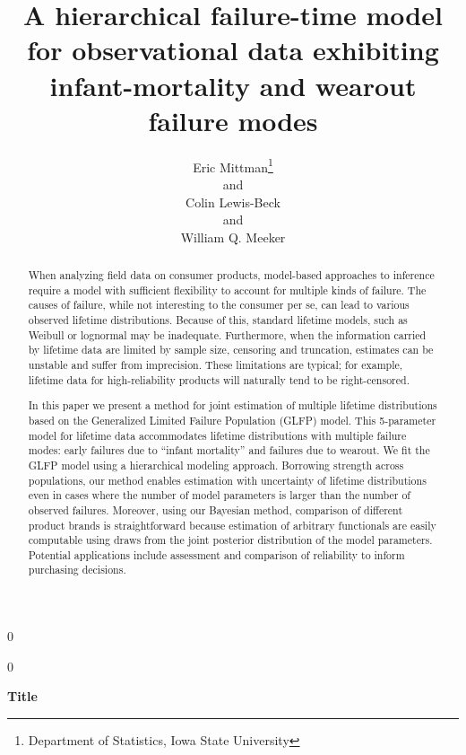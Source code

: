 \documentclass[12pt]{article}
\newcommand{\blind}{0}
\begin{document}
\def\spacingset#1{\renewcommand{\baselinestretch}%
{#1}\small\normalsize} \spacingset{1}



\blind
{
  \title{\bf A hierarchical failure-time model for observational data exhibiting infant-mortality and wearout failure modes}
  \author{Eric Mittman\thanks{Department of Statistics, Iowa State University}\\
    and \\
    Colin Lewis-Beck\footnotemark[1]\\
    and \\
    William Q. Meeker\footnotemark[1]}
  \maketitle
} \fi

\blind
{
  \bigskip
  \bigskip
  \bigskip
  \begin{center}
    {\LARGE\bf Title}
\end{center}
  \medskip
} \fi

\bigskip
\begin{abstract}
When analyzing field data on consumer products, model-based approaches to inference require a model with sufficient flexibility to account for multiple kinds of failure. The causes of failure, while not interesting to the consumer per se, can lead to various observed lifetime distributions. Because of this, standard lifetime models, such as Weibull or lognormal may be inadequate. 
Furthermore, when the information carried by lifetime data are limited by sample size, censoring and truncation, estimates can be unstable and suffer from imprecision. These limitations are typical; for example, lifetime data for high-reliability products will naturally tend to be right-censored.


In this paper we present a method for joint estimation of multiple lifetime distributions based on the Generalized Limited Failure Population (GLFP) model. This 5-parameter model for lifetime data accommodates lifetime distributions with multiple failure modes:  early failures due to ``infant mortality'' and failures due to wearout. We fit the GLFP model using a hierarchical modeling approach.  Borrowing strength across populations, our method enables estimation with uncertainty of lifetime distributions even in cases where the number of model parameters is larger than the number of observed failures.  Moreover, using our Bayesian method, comparison of different product brands is straightforward because estimation of arbitrary functionals are easily computable using draws from the joint posterior distribution of the model parameters. Potential applications include assessment and comparison of reliability to inform purchasing decisions.
\end{abstract}
\end{document}
